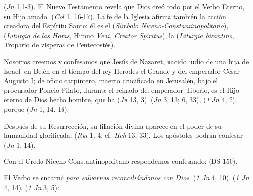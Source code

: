 	  (\emph{Jn} 1,1-3). El Nuevo Testamento revela que Dios creó todo por el Verbo Eterno, su Hijo amado.  (\emph{Col} 1, 16-17). La fe de la Iglesia afirma también la acción creadora del Espíritu Santo: él es el  (\emph{Símbolo Niceno-Constantinopolitano}),  (\emph{Liturgia de las Horas}, Himno \emph{Veni, Creator Spiritus}), la  (\emph{Liturgia bizantina}, Tropario de vísperas de Pentecostés).
	
	 Nosotros creemos y confesamos que Jesús de Nazaret, nacido judío de una hija de Israel, en Belén en el tiempo del rey Herodes el Grande y del emperador César Augusto I; de oficio carpintero, muerto crucificado en Jerusalén, bajo el procurador Poncio Pilato, durante el reinado del emperador Tiberio, es el Hijo eterno de Dios hecho hombre, que ha  (\emph{Jn} 13, 3),  (\emph{Jn} 3, 13; 6, 33),  (\emph{1 Jn} 4, 2), porque  (\emph{Jn} 1, 14. 16).
	
	 Después de su Resurrección, su filiación divina aparece en el poder de su humanidad glorificada:  (\emph{Rm} 1, 4; cf. \emph{Hch} 13, 33). Los apóstoles podrán confesar  (\emph{Jn} 1, 14).
	
	 Con el Credo Niceno-Constantinopolitano respondemos confesando:  (DS 150).
	
	 El Verbo se encarnó \emph{para salvarnos reconciliándonos con Dios}:  (\emph{1 Jn} 4, 10).  (\emph{1 Jn} 4, 14).  (\emph{1 Jn} 3, 5):
	
